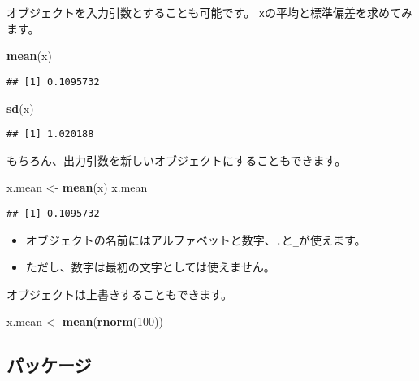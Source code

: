 \documentclass[]{bxjsarticle}
\newenvironment{Shaded}{\begin{snugshade}}{\end{snugshade}}
\newcommand{\DecValTok}[1]{\textcolor[rgb]{0.00,0.00,0.81}{#1}}
\newcommand{\KeywordTok}[1]{\textcolor[rgb]{0.13,0.29,0.53}{\textbf{#1}}}
\newcommand{\NormalTok}[1]{#1}
\newcommand{\StringTok}[1]{\textcolor[rgb]{0.31,0.60,0.02}{#1}}
\providecommand{\tightlist}{%
  \setlength{\itemsep}{0pt}\setlength{\parskip}{0pt}}
\begin{document}
オブジェクトを入力引数とすることも可能です。
\texttt{x}の平均と標準偏差を求めてみます。

\begin{Shaded}
\begin{Highlighting}[]
\KeywordTok{mean}\NormalTok{(x)}
\end{Highlighting}
\end{Shaded}

\begin{verbatim}
## [1] 0.1095732
\end{verbatim}

\begin{Shaded}
\begin{Highlighting}[]
\KeywordTok{sd}\NormalTok{(x)}
\end{Highlighting}
\end{Shaded}

\begin{verbatim}
## [1] 1.020188
\end{verbatim}

もちろん、出力引数を新しいオブジェクトにすることもできます。

\begin{Shaded}
\begin{Highlighting}[]
\NormalTok{x.mean <-}\StringTok{ }\KeywordTok{mean}\NormalTok{(x)}
\NormalTok{x.mean}
\end{Highlighting}
\end{Shaded}

\begin{verbatim}
## [1] 0.1095732
\end{verbatim}

\begin{itemize}
\tightlist
\item
  オブジェクトの名前にはアルファベットと数字、\texttt{.}と\texttt{\_}が使えます。
\item
  ただし、数字は最初の文字としては使えません。
\end{itemize}

オブジェクトは上書きすることもできます。

\begin{Shaded}
\begin{Highlighting}[]
\NormalTok{x.mean <-}\StringTok{ }\KeywordTok{mean}\NormalTok{(}\KeywordTok{rnorm}\NormalTok{(}\DecValTok{100}\NormalTok{))}
\end{Highlighting}
\end{Shaded}

\hypertarget{ux30d1ux30c3ux30b1ux30fcux30b8}{%
\subsection{パッケージ}\label{ux30d1ux30c3ux30b1ux30fcux30b8}}
\end{document}
